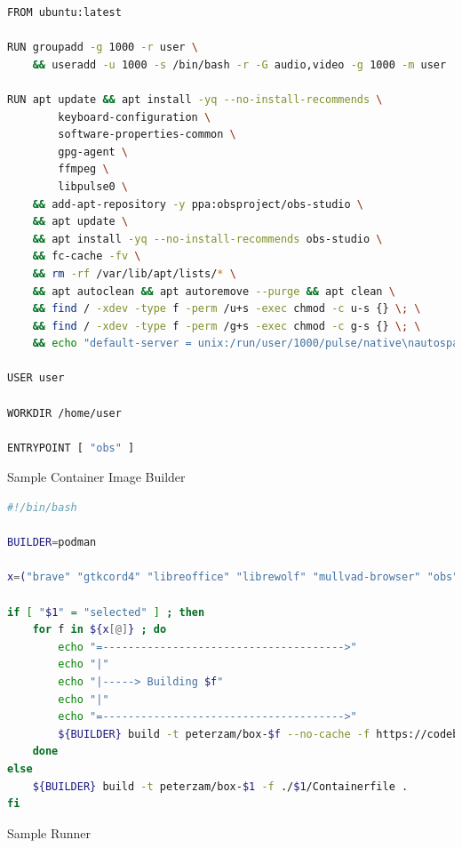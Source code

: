 \documentclass[journal,onecolumn]{IEEEtran}
\begin{document}
\begin{lstlisting}[language=Bash]
FROM ubuntu:latest

RUN groupadd -g 1000 -r user \
    && useradd -u 1000 -s /bin/bash -r -G audio,video -g 1000 -m user

RUN apt update && apt install -yq --no-install-recommends \
        keyboard-configuration \
        software-properties-common \
        gpg-agent \
        ffmpeg \
        libpulse0 \
    && add-apt-repository -y ppa:obsproject/obs-studio \
    && apt update \
    && apt install -yq --no-install-recommends obs-studio \
    && fc-cache -fv \
    && rm -rf /var/lib/apt/lists/* \
    && apt autoclean && apt autoremove --purge && apt clean \
    && find / -xdev -type f -perm /u+s -exec chmod -c u-s {} \; \
    && find / -xdev -type f -perm /g+s -exec chmod -c g-s {} \; \
    && echo "default-server = unix:/run/user/1000/pulse/native\nautospawn = no\ndaemon-binary = /bin/true\nenable-shm = false" > /etc/pulse/client.conf

USER user

WORKDIR /home/user

ENTRYPOINT [ "obs" ]

\end{lstlisting}

Sample Container Image Builder
\begin{lstlisting}[language=Bash]
#!/bin/bash

BUILDER=podman

x=("brave" "gtkcord4" "libreoffice" "librewolf" "mullvad-browser" "obs" "qbittorrent" "staruml" "telegram" "tor" "ungoogled-chromium" "winbox" "zoom")

if [ "$1" = "selected" ] ; then
    for f in ${x[@]} ; do
        echo "=-------------------------------------->"
        echo "|"
        echo "|-----> Building $f"
        echo "|"
        echo "=-------------------------------------->"
        ${BUILDER} build -t peterzam/box-$f --no-cache -f https://codeberg.org/peterzam/box/raw/branch/main/$f/Containerfile .
    done
else
    ${BUILDER} build -t peterzam/box-$1 -f ./$1/Containerfile .
fi
\end{lstlisting}

Sample Runner
\end{document}
